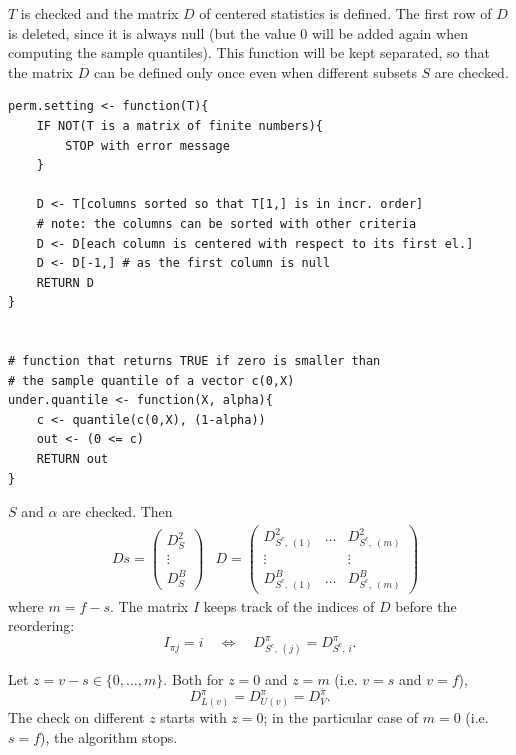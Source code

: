 \documentclass[11pt,a4paper,openright,twoside]{article}
\begin{document}
\vspace{3mm}
\noindent
$T$ is checked and the matrix $D$ of centered statistics is defined. The first row of $D$ is deleted, since it is always null (but the value 0 will be added again when computing the sample quantiles). This function will be kept separated, so that the matrix $D$ can be defined only once even when different subsets $S$ are checked.
\begin{lstlisting}
perm.setting <- function(T){
	IF NOT(T is a matrix of finite numbers){
		STOP with error message
	}

	D <- T[columns sorted so that T[1,] is in incr. order]
	# note: the columns can be sorted with other criteria
	D <- D[each column is centered with respect to its first el.]
	D <- D[-1,] # as the first column is null
	RETURN D
}


# function that returns TRUE if zero is smaller than
# the sample quantile of a vector c(0,X)
under.quantile <- function(X, alpha){
	c <- quantile(c(0,X), (1-alpha))
	out <- (0 <= c)
	RETURN out
}
\end{lstlisting}

\vspace{3mm}
\noindent
$S$ and $\alpha$ are checked. Then
\begin{align*}
&Ds =
\begin{pmatrix}
D_S^2\\
\vdots\\
D_S^B
\end{pmatrix}
&D =
\begin{pmatrix}
D_{S^c,\,(1)}^{2} & \ldots & D_{S^c,\,(m)}^{2}\\
\vdots &  & \vdots\\
D_{S^c,\,(1)}^{B} & \ldots & D_{S^c,\,(m)}^{B}
\end{pmatrix}
\end{align*}
where $m=f-s$. The matrix $I$ keeps track of the indices of $D$ before the reordering:
\[I_{\pi j}=i\quad\Longleftrightarrow\quad D_{S^c,\,(j)}^{\pi}=D_{S^c,\,i}^{\pi}.\]

Let $z=v-s\in\{0,\ldots,m\}$. Both for $z=0$ and $z=m$ (i.e. $v=s$ and $v=f$),
\[D_{L(v)}^{\pi}=D_{U(v)}^{\pi}=D_V^{\pi}.\]
The check on different $z$ starts with $z=0$; in the particular case of $m=0$ (i.e. $s=f$), the algorithm stops.
\end{document}
